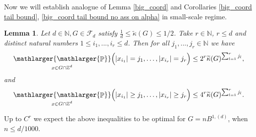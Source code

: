 \documentclass[a4paper,oneside, reqno]{amsart}
\numberwithin{equation}{section}
\newtheorem{Lem}[Thm]{Lemma}
\theoremstyle{definition}%
\theoremstyle{definition}
\theoremstyle{definition}%
\theoremstyle{definition}
\newcommand{\Pro}{\mathop{\mathbb{P}}}
\newcommand{\Z}{\mathbb{Z}}
\newcommand{\N}{\mathbb{N}}
\newcommand{\spr}[1]{\underset{_{\substack{#1}}}{\mathlarger{\mathlarger{\Pro}}}}
\begin{document}
Now we will establish analogue of Lemma \ref{big_coord} and Corollaries \ref{big_coord tail bound}, \ref{big_coord tail bound no ass on alpha} in small-scale regime.
\begin{Lem} \label{big_coord small scales}
    Let $d \in \N, G \in \mathcal{F}_d$ satisfy  $\frac{1}{d} \le \widetilde{\kappa}(G) \le 1/2 $. Take $r \in \N$, $r \le d$ and distinct natural numbers $1 \le i_1,...,i_r \le d$. Then for all $j_1,...,j_r \in \N$ we have
    \begin{equation} \label{eq:big cord small scale eq}
        \spr{x \in G \cap \Z^d} \Big( |x_{i_1}|=j_1, \ldots,|x_{i_r}|=j_r \Big) \le  2^r \widetilde{\kappa}(G)^{\sum_{l=1}^r j_l} ,
    \end{equation}
    and
    \begin{equation} \label{eq:big cord small scale geq}
       \spr{x \in G \cap \Z^d} \Big( |x_{i_1}| \ge j_1, \ldots,|x_{i_r}| \ge j_r \Big) \le  4^r \widetilde{\kappa}(G)^{\sum_{l=1}^r j_l} .
    \end{equation}
\end{Lem}
Up to $C^r$ we expect the above inequalities to be optimal for $G=nB^{1,(d)}$, when $n \le d/1000$.
\end{document}
